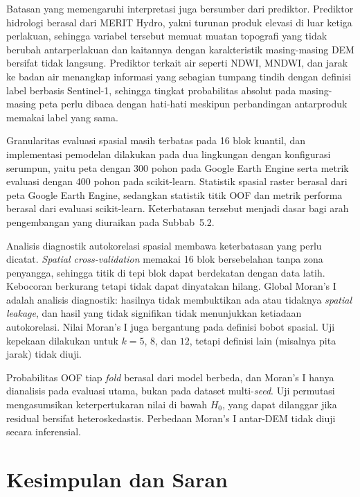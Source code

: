 \documentclass[12pt]{article}
\begin{document}
Batasan yang memengaruhi interpretasi juga bersumber dari prediktor. Prediktor
hidrologi berasal dari MERIT Hydro, yakni turunan produk elevasi di luar
ketiga perlakuan, sehingga variabel tersebut memuat muatan topografi yang
tidak berubah antarperlakuan dan kaitannya dengan karakteristik masing-masing
DEM bersifat tidak langsung. Prediktor terkait air seperti NDWI, MNDWI, dan
jarak ke badan air menangkap informasi yang sebagian tumpang tindih dengan
definisi label berbasis Sentinel-1, sehingga tingkat probabilitas absolut
pada masing-masing peta perlu dibaca dengan hati-hati meskipun perbandingan
antarproduk memakai label yang sama.

Granularitas evaluasi spasial masih terbatas pada 16 blok kuantil, dan
implementasi pemodelan dilakukan pada dua lingkungan dengan konfigurasi
serumpun, yaitu peta dengan 300 pohon pada Google Earth Engine serta metrik
evaluasi dengan 400 pohon pada scikit-learn. Statistik spasial raster
berasal dari peta Google Earth Engine, sedangkan statistik titik OOF dan
metrik performa berasal dari evaluasi scikit-learn. Keterbatasan tersebut
menjadi dasar bagi arah pengembangan yang
diuraikan pada Subbab~5.2.

Analisis diagnostik autokorelasi spasial membawa keterbatasan yang
perlu dicatat. \textit{Spatial cross-validation} memakai 16 blok bersebelahan
tanpa zona penyangga, sehingga titik di tepi blok dapat berdekatan dengan
data latih. Kebocoran berkurang tetapi tidak dapat dinyatakan hilang. Global
Moran's I adalah analisis diagnostik: hasilnya tidak membuktikan ada atau
tidaknya \textit{spatial leakage}, dan hasil yang tidak signifikan tidak
menunjukkan ketiadaan autokorelasi. Nilai Moran's I juga bergantung pada
definisi bobot spasial. Uji kepekaan dilakukan untuk $k=5$, $8$, dan $12$,
tetapi definisi lain (misalnya pita jarak) tidak diuji.

Probabilitas OOF tiap \textit{fold} berasal dari model berbeda, dan Moran's I
hanya dianalisis pada evaluasi utama, bukan pada dataset multi-\textit{seed}.
Uji permutasi mengasumsikan keterpertukaran nilai di bawah $H_0$, yang dapat
dilanggar jika residual bersifat heteroskedastis. Perbedaan Moran's I
antar-DEM tidak diuji secara inferensial.

\FloatBarrier

\clearpage


\section{Kesimpulan dan Saran}
\end{document}
